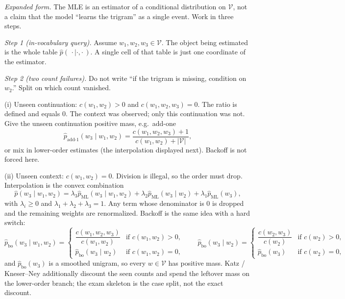 \documentclass[11pt,a4paper]{article}
\theoremstyle{definition}
\begin{document}
\textit{Expanded form.}
The MLE is an estimator of a conditional distribution on \(\mathcal{V}\), not a claim that the model ``learns the trigram'' as a single event. Work in three steps.

\textit{Step 1 (in-vocabulary query).}
Assume \(w_1,w_2,w_3\in\mathcal{V}\). The object being estimated is the whole table \(\widehat p(\,\cdot\mid\cdot,\cdot\,)\). A single cell of that table is just one coordinate of the estimator.

\textit{Step 2 (two count failures).}
Do not write ``if the trigram is missing, condition on \(w_2\).'' Split on which count vanished.

(i) Unseen continuation: \(c(w_1,w_2)>0\) and \(c(w_1,w_2,w_3)=0\). The ratio is defined and equals \(0\). The context was observed; only this continuation was not. Give the unseen continuation positive mass, e.g.\ add-one
\[
\widehat p_{\mathrm{add\text{-}1}}(w_3\mid w_1,w_2)
=\frac{c(w_1,w_2,w_3)+1}{c(w_1,w_2)+|\mathcal{V}|},
\]
or mix in lower-order estimates (the interpolation displayed next). Backoff is not forced here.

(ii) Unseen context: \(c(w_1,w_2)=0\). Division is illegal, so the order must drop. Interpolation is the convex combination
\[
\widehat p(w_3\mid w_1,w_2)
=\lambda_3\widehat p_{\mathrm{ML}}(w_3\mid w_1,w_2)
+\lambda_2\widehat p_{\mathrm{ML}}(w_3\mid w_2)
+\lambda_1\widehat p_{\mathrm{ML}}(w_3),
\]
with \(\lambda_i\ge 0\) and \(\lambda_1+\lambda_2+\lambda_3=1\). Any term whose denominator is \(0\) is dropped and the remaining weights are renormalized. Backoff is the same idea with a hard switch:
\[
\widehat p_{\mathrm{bo}}(w_3\mid w_1,w_2)
=
\begin{cases}
\dfrac{c(w_1,w_2,w_3)}{c(w_1,w_2)}
  & \text{if }c(w_1,w_2)>0,\\[6pt]
\widehat p_{\mathrm{bo}}(w_3\mid w_2)
  & \text{if }c(w_1,w_2)=0,
\end{cases}
\qquad
\widehat p_{\mathrm{bo}}(w_3\mid w_2)
=
\begin{cases}
\dfrac{c(w_2,w_3)}{c(w_2)}
  & \text{if }c(w_2)>0,\\[6pt]
\widehat p_{\mathrm{bo}}(w_3)
  & \text{if }c(w_2)=0,
\end{cases}
\]
and \(\widehat p_{\mathrm{bo}}(w_3)\) is a smoothed unigram, so every \(w\in\mathcal{V}\) has positive mass. Katz / Kneser--Ney additionally discount the seen counts and spend the leftover mass on the lower-order branch; the exam skeleton is the case split, not the exact discount.
\end{document}
